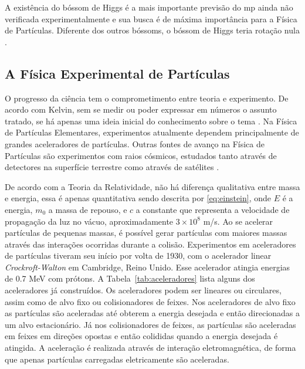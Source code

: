 A existência do bóssom de Higgs é a mais importante previsão do \gls{mp} 
ainda não verificada experimentalmente e sua busca é de máxima importância para
a Física de Partículas. Diferente dos outros bóssoms, o
bóssom de Higgs teria rotação nula \cite{Intro_Nuclear}.

\subsection{A Física Experimental de Partículas}
\label{ssec:fisexp}

O progresso da ciência tem o comprometimento entre teoria e experimento. De
acordo com Kelvin, sem se medir ou poder expressar em números o assunto tratado, 
se há apenas uma ideia inicial do conhecimento sobre o tema \cite{kelvin}. 
Na Física de Partículas Elementares, experimentos atualmente dependem
principalmente de grandes aceleradores de partículas. Outras fontes de avanço na
Física de Partículas são experimentos com raios cósmicos, estudados tanto
através de detectores na superfície terrestre como através de satélites 
\cite{nature_space_and_time}. 

De acordo com a Teoria da Relatividade, não há diferença qualitativa entre
massa e energia, essa é apenas quantitativa \cite{einstein} sendo descrita por
\ref{eq:einstein}, onde $E$ é a energia, $m_0$ a massa de repouso, e $c$ a constante que representa a
velocidade de propagação da luz no vácuo, aproximadamente $3\times10^{8}$ m/s. Ao se acelerar
partículas de pequenas massas, é possível gerar partículas com maiores massas
através das interações ocorridas durante a colisão. Experimentos em
aceleradores de partículas tiveram seu início por volta de 1930, com o
acelerador linear \emph{Crockroft-Walton} em Cambridge, Reino Unido. Esse
acelerador atingia energias de 0.7 MeV com prótons. A Tabela~\ref{tab:aceleradores} 
lista alguns dos aceleradores já construídos. Os
aceleradores podem ser lineares ou circulares, assim como de alvo fixo ou colisionadores
de feixes. Nos aceleradores de alvo fixo as partículas são aceleradas até
obterem a energia desejada e então direcionadas a um alvo estacionário. Já nos
colisionadores de feixes, as partículas são aceleradas em feixes em direções
opostas e então colididas quando a energia desejada é atingida. A aceleração é
realizada através de interação eletromagnética, de forma que apenas
partículas carregadas eletricamente são aceleradas.



